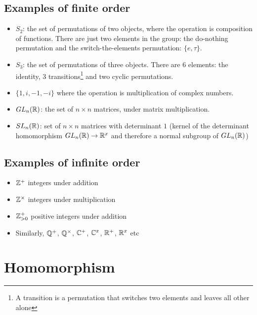 \subsection{Examples of finite order}

\begin{itemize}
\item $S_2$: the set of permutations of two objects, where the operation is
  composition of functions.  There are just two elements in the group: the
  do-nothing permutation and the switch-the-elements permutation: $\{e,
  \tau\}$.

\item $S_3$: the set of permutations of three objects. There are 6 elements: the
  identity, 3 transitions\footnote{A transition is a permutation that switches two
  elements and leaves all other alone} and two cyclic permutations.

\item $\{1, i, -1, -i\}$ where the operation is multiplication of complex numbers.

\item $GL_n(\mathbb{R})$: the set of $n \times n$ matrices, under matrix multiplication.

\item $SL_n(\mathbb{R})$: set of $n \times n$ matrices with determinant $1$ (kernel of the
  determinant homomorphism $GL_n(\mathbb{R}) \rightarrow \mathbb{R}^x$ and therefore a normal
  subgroup of $GL_n(\mathbb{R})$)
\end{itemize}

\subsection{Examples of infinite order}

\begin{itemize}
\item $\mathbb{Z}^+$ integers under addition

\item $\mathbb{Z}^\times$ integers under multiplication

\item $\mathbb{Z}_{>0}^+$ positive integers under addition

\item Similarly, $\mathbb{Q}^+$, $\mathbb{Q}^\times$, $\mathbb{C}^+$, $\mathbb{C}^x$, $\mathbb{R}^+$, $\mathbb{R}^x$ etc

\end{itemize}

\section{Homomorphism}

